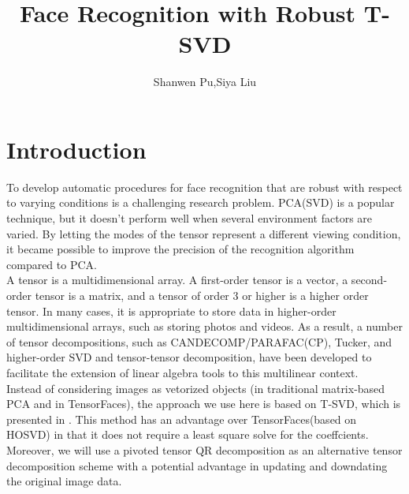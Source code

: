 \documentclass[english]{article}
\newcommand{\<}{\langle}
\renewcommand{\>}{\rangle}
\theoremstyle{definition}
\begin{document}
\title{Face Recognition with Robust T-SVD}
\author{Shanwen Pu,\quad Siya Liu}
\maketitle



\section{Introduction}
To develop automatic procedures for face recognition that are robust with respect to varying conditions is a challenging research problem. PCA(SVD) is a popular technique, but it doesn't perform well when several environment factors are varied. By letting the modes of the tensor represent a different viewing condition, it became possible to improve the precision of the recognition algorithm compared to PCA.\\

A tensor is a multidimensional array. A first-order tensor is a vector, a second-order tensor is a matrix, and a tensor of order 3 or higher is a higher order tensor. In many cases, it is appropriate to store data in higher-order multidimensional arrays, such as storing photos and videos. As a result, a number of tensor decompositions, such as CANDECOMP/PARAFAC(CP), Tucker, and higher-order SVD and tensor-tensor decomposition, have been developed to facilitate the extension of linear algebra tools to this multilinear context.\\

Instead of considering images as vetorized objects (in traditional matrix-based PCA and in TensorFaces), the approach we use here is based on T-SVD, which is presented in \cite{hao2013facial}. This method has an advantage over TensorFaces(based on HOSVD) in that it does not require a least square solve for the coeffcients. Moreover, we will use a pivoted tensor QR decomposition as an alternative tensor decomposition scheme with a potential advantage in updating and downdating the original image data.
\end{document}
